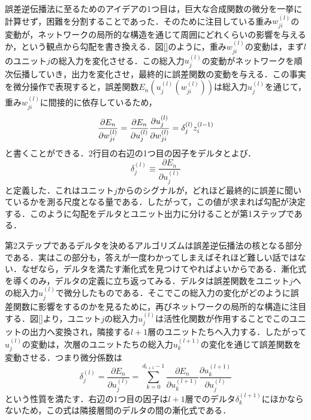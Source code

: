 \documentclass[a4paper,11pt]{jsreport}
\begin{document}
誤差逆伝播法に至るためのアイデアの1つ目は，巨大な合成関数の微分を一挙に計算せず，困難を分割することであった．そのために注目している重み$w_{ji}^{(l)}$の変動が，ネットワークの局所的な構造を通じて周囲にどれくらいの影響を与えるか，という観点から勾配を書き換える．図\ref{}のように，重み$w_{ji}^{(l)}$の変動は，まず$l$のユニット$j$の総入力を変化させる．この総入力$u_j^{(l)}$の変動がネットワークを順次伝播していき，出力を変化させ，最終的に誤差関数の変動を与える．この事実を微分操作で表現すると，誤差関数$E_n(u_j^{(l)}(w_{ji}^{(l)}))$は総入力$u_j^{(l)}$を通じて，重み$w_{ji}^{(l)}$に間接的に依存しているため，
\begin{equation}
  \frac{\partial E_n}{\partial w_{ji}^{(l)}}
  = \frac{\partial E_n}{\partial u_j^{(l)}} \frac{\partial u_j^{(l)}}{\partial w_{ji}^{(l)}} \notag \\
  = \delta_j^{(l)} z_i^{(l-1)} \label{ニューラルネットワークパラメータ微分}
\end{equation}
と書くことができる．2行目の右辺の1つ目の因子をデルタとよび．
\begin{equation}
  \delta_j^{(l)}
  \equiv \frac{\partial E_n}{\partial u_j^{(l)}}
\end{equation}
と定義した．これはユニット$j$からのシグナルが，どれほど最終的に誤差に聞いているかを測る尺度となる量である．したがって，この値が求まれば勾配が決定する．このように勾配をデルタとユニット出力に分けることが第1ステップである．\par
第2ステップであるデルタを決めるアルゴリズムは誤差逆伝播法の核となる部分である．実はこの部分も，答えが一度わかってしまえばそれほど難しい話ではない．なぜなら，デルタを満たす漸化式を見つけてやればよいからである．漸化式を導くのみ，デルタの定義に立ち返ってみる．デルタは誤差関数をユニット$j$への総入力$u_j^{(l)}$で微分したものである．そこでこの総入力の変化がどのように誤差関数に影響をするのかを見るために，再びネットワークの局所的な構造に注目する．図\ref{}より，ユニット$j$の総入力$u_j^{(l)}$は活性化関数が作用することでこのユニットの出力へ変換され，隣接する$l+1$層のユニットたちへ入力する．したがって$u_j^{(l)}$の変動は，次層のユニットたちの総入力$u_k^{(l+1)}$の変化を通じて誤差関数を変動させる．つまり微分係数は
\begin{equation}
  \delta_j^{(l)}
  = \frac{\partial E_n}{\partial u_j^{(l)}}
  = \sum_{k=0}^{d_{l+1}-1} \frac{\partial E_n}{\partial u_k^{(l+1)}}\frac{\partial u_k^{(l+1)}}{\partial u_j^{(l)}}
\end{equation}
という性質を満たす．右辺の1つ目の因子は$l+1$層でのデルタ$\delta_k^{(l+1)}$にほかならないため，この式は隣接層間のデルタの間の漸化式である．
\end{document}

